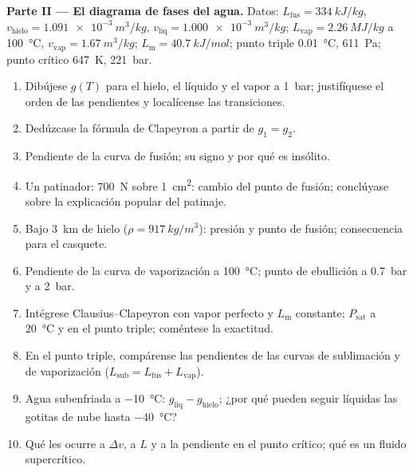 \begin{problem}
\textbf{Parte II --- El diagrama de fases del agua.}
Datos: $L_{\text{fus}} = \qty{334}{kJ/kg}$, $v_{\text{hielo}} = \qty{1.091e-3}{m^3/kg}$,
$v_{\text{liq}} = \qty{1.000e-3}{m^3/kg}$; $L_{\text{vap}} = \qty{2.26}{MJ/kg}$ a
\qty{100}{\celsius}, $v_{\text{vap}} = \qty{1.67}{m^3/kg}$; $L_{\text{m}} = \qty{40.7}{kJ/mol}$;
punto triple \qty{0.01}{\celsius}, \qty{611}{Pa}; punto crítico \qty{647}{K},
\qty{221}{bar}.
\begin{enumerate}[resume]
  \item Dibújese $g(T)$ para el hielo, el líquido y el vapor a \qty{1}{bar}; justifíquese
        el orden de las pendientes y localícense las transiciones.
  \item Dedúzcase la fórmula de Clapeyron a partir de $g_1 = g_2$.
  \item Pendiente de la curva de fusión; su signo y por qué es insólito.
  \item Un patinador: \qty{700}{N} sobre \qty{1}{cm^2}: cambio del punto de
        fusión; conclúyase sobre la explicación popular del patinaje.
  \item Bajo \qty{3}{km} de hielo ($\rho = \qty{917}{kg/m^3}$): presión y
        punto de fusión; consecuencia para el casquete.
  \item Pendiente de la curva de vaporización a \qty{100}{\celsius}; punto de
        ebullición a \qty{0.7}{bar} y a \qty{2}{bar}.
  \item Intégrese Clausius--Clapeyron con vapor perfecto y
        $L_{\text{m}}$ constante; $P_{\text{sat}}$ a \qty{20}{\celsius} y en
        el punto triple; coméntese la exactitud.
  \item En el punto triple, compárense las pendientes de las curvas de sublimación y de
        vaporización ($L_{\text{sub}} = L_{\text{fus}} + L_{\text{vap}}$).
  \item Agua subenfriada a \qty{-10}{\celsius}: $g_{\text{liq}} - g_{\text{hielo}}$;
        ¿por qué pueden seguir líquidas las gotitas de nube hasta \qty{-40}{\celsius}?
  \item Qué les ocurre a $\Delta v$, a $L$ y a la pendiente en el punto
        crítico; qué es un fluido supercrítico.
\end{enumerate}


\end{problem}

